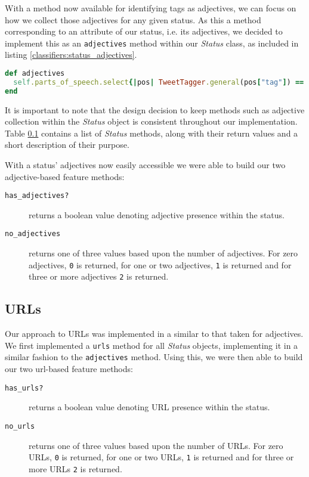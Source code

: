 With a method now available for identifying tags as adjectives, we can focus on how we collect those adjectives for any given status. As this a method corresponding to an attribute of our status, i.e. its adjectives, we decided to implement this as an \texttt{adjectives} method within our \emph{Status} class, as included in listing \ref{classifiers:status_adjectives}.

\begin{lstlisting}[language=Ruby, caption={\emph{Status} object method for returning its adjectives}, label=classifiers:status_adjectives]
def adjectives
  self.parts_of_speech.select{|pos| TweetTagger.general(pos["tag"]) == "adj"}
end
\end{lstlisting}

It is important to note that the design decision to keep methods such as adjective collection within the \emph{Status} object is consistent throughout our implementation. Table \ref{} contains a list of \emph{Status} methods, along with their return values and a short description of their purpose.

With a status' adjectives now easily accessible we were able to build our two adjective-based feature methods:

\begin{description}
	\item [\texttt{has\_adjectives?}] returns a boolean value denoting adjective presence within the status.
	\item [\texttt{no\_adjectives}] returns one of three values based upon the number of adjectives. For zero adjectives, \texttt{0} is returned, for one or two adjectives, \texttt{1} is returned and for three or more adjectives \texttt{2} is returned.
\end{description}

\subsection{URLs}

Our approach to URLs was implemented in a similar to that taken for adjectives. We first implemented a \texttt{urls} method for all \emph{Status} objects, implementing it in a similar fashion to the \texttt{adjectives} method. Using this, we were then able to build our two url-based feature methods:

\begin{description}
	\item [\texttt{has\_urls?}] returns a boolean value denoting URL presence within the status.
	\item [\texttt{no\_urls}] returns one of three values based upon the number of URLs. For zero URLs, \texttt{0} is returned, for one or two URLs, \texttt{1} is returned and for three or more URLs \texttt{2} is returned.
\end{description}

